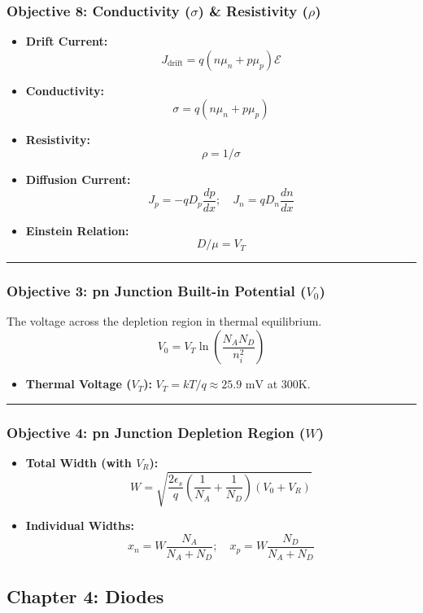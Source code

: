 \documentclass[10pt]{article}
\begin{document}
\begin{multicols}{2}
\subsubsection*{Objective 8: Conductivity ($\sigma$) \& Resistivity ($\rho$)}
\begin{itemize}
    \item \textbf{Drift Current:} \[ J_{\text{drift}} = q (n \mu_n + p \mu_p) \mathcal{E} \]
    \item \textbf{Conductivity:} \[ \sigma = q (n \mu_n + p \mu_p) \]
    \item \textbf{Resistivity:} \[ \rho = 1 / \sigma \]
    \item \textbf{Diffusion Current:} \[ J_p = -q D_p \frac{dp}{dx}; \quad J_n = q D_n \frac{dn}{dx} \]
    \item \textbf{Einstein Relation:} \[ D / \mu = V_T \]
\end{itemize}

\hrule

\subsubsection*{Objective 3: pn Junction Built-in Potential ($V_0$)}
The voltage across the depletion region in thermal equilibrium.
\[ V_0 = V_T \ln \left( \frac{N_A N_D}{n_i^2} \right) \]
\begin{itemize}
    \item \textbf{Thermal Voltage ($V_T$):} \( V_T = kT/q \approx 25.9 \text{ mV} \) at 300K.
\end{itemize}

\hrule

\subsubsection*{Objective 4: pn Junction Depletion Region ($W$)}
\begin{itemize}
    \item \textbf{Total Width (with $V_R$):} \[ W = \sqrt{\frac{2\epsilon_s}{q} \left(\frac{1}{N_A} + \frac{1}{N_D}\right) (V_0 + V_R)} \]
    \item \textbf{Individual Widths:} \[ x_n = W \frac{N_A}{N_A + N_D}; \quad x_p = W \frac{N_D}{N_A + N_D} \]
\end{itemize}

\subsection*{Chapter 4: Diodes}


\end{multicols}
\end{document}
